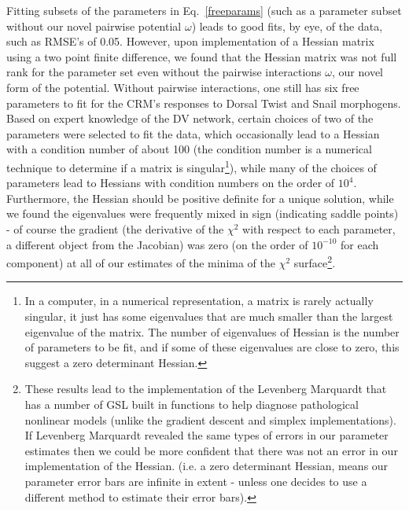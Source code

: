    Fitting subsets of the parameters in Eq.~\ref{freeparams} (such as a parameter subset without our novel pairwise potential $\omega$) leads to good fits, by eye, of the data, such as RMSE's of 0.05.  However, upon implementation of a Hessian matrix using a two point finite difference, we found that the Hessian matrix was not full rank for the parameter set even without the pairwise interactions $\omega$, our novel form of the potential.  Without pairwise interactions, one still has six free parameters to fit for the CRM's responses to Dorsal Twist and Snail morphogens.  Based on expert knowledge of the DV network, certain choices of two of the parameters were selected to fit the data, which occasionally lead to a Hessian with a condition number of about 100 (the condition number is a numerical technique to determine if a matrix is singular\footnote{In a computer, in a numerical representation, a matrix is rarely actually singular, it just has some eigenvalues that are much smaller than the largest eigenvalue of the matrix.  The number of eigenvalues of Hessian is the number of parameters to be fit, and if some of these eigenvalues are close to zero, this suggest a zero determinant Hessian.}), while many of the choices of parameters lead to Hessians with condition numbers on the order of $10^4$.  Furthermore, the Hessian should be positive definite for a unique solution, while we found the eigenvalues were frequently mixed in sign (indicating saddle points) - of course the gradient (the derivative of the $\chi^2$ with respect to each parameter, a different object from the Jacobian) was zero (on the order of $10^{-10}$ for each component) at all of our estimates of the minima of the $\chi^2$ surface\footnote{These results lead to the implementation of the Levenberg Marquardt that has a number of GSL built in functions to help diagnose pathological nonlinear models (unlike the gradient descent and simplex implementations).  If Levenberg Marquardt revealed the same types of errors in our parameter estimates then we could be more confident that there was not an error in our implementation of the Hessian.  (i.e. a zero determinant Hessian, means our parameter error bars are infinite in extent - unless one decides to use a different method to estimate their error bars).}.
 

